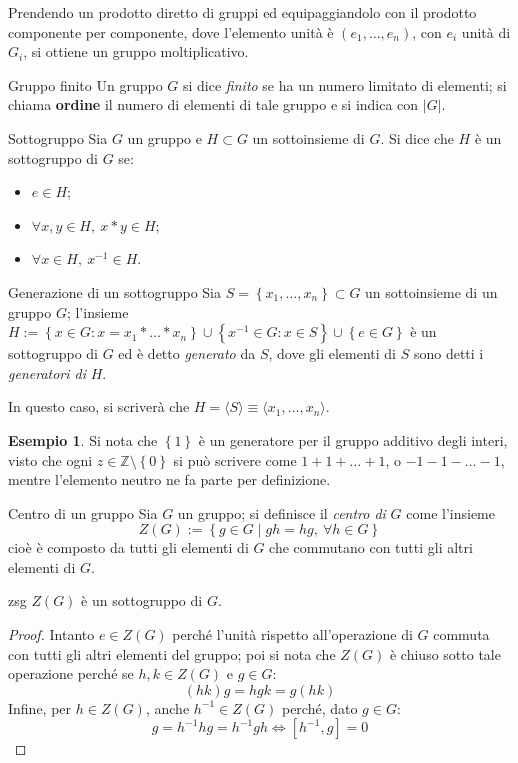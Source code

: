 \documentclass[11pt, a4paper]{scrartcl}
\theoremstyle{definition}
\newtheorem{esempio}{Esempio}
\numberwithin{esempio}{section}
\theoremstyle{definition}
\numberwithin{obs}{section}
\numberwithin{nota}{section}
\numberwithin{equation}{subsection}
\begin{document}
\noindent Prendendo un prodotto diretto di gruppi ed equipaggiandolo con il prodotto componente per componente, dove l'elemento unit\`a \`e $(e_1,\ldots,e_n)$, con $e_i$ unit\`a di $G_i$, si ottiene un gruppo moltiplicativo.
\begin{definizione}
	{Gruppo finito}{}
	Un gruppo $G$ si dice \textit{finito} se ha un numero limitato di elementi; si chiama \textbf{ordine} il numero di elementi di tale gruppo e si indica con $|G|$.
\end{definizione}
\begin{definizione}
	{Sottogruppo}{}
	Sia $G$ un gruppo e $H \subset G$ un sottoinsieme di $G$. Si dice che $H$ \`e un sottogruppo di $G$ se:
	\begin{itemize}
		\item  $e \in H$;
		\item $\forall x,y \in H, \ x*y \in H$;
		\item $\forall x \in H, \ x^{-1}  \in H$.
	\end{itemize}
\end{definizione}
\begin{definizione}
	{Generazione di un sottogruppo}{}
	Sia $S = \left\{ x_1,\ldots,x_n \right\} \subset  G$ un sottoinsieme di un gruppo $G$; l'insieme $H:= \left\{ x \in G : x = x_1 *\ldots*x_n  \right\}\cup \left\{ x^{-1} \in G : x \in S \right\} \cup \left\{ e \in G \right\}  $ \`e un sottogruppo di $G$ ed \`e detto \textit{generato} da $S$, dove gli elementi di $S$ sono detti i \textit{generatori di} $H$.

	In questo caso, si scriver\`a che $H = \langle S \rangle\equiv \langle x_1,\ldots,x_n \rangle$.
\end{definizione}
\begin{esempio}\label{1genz}
Si nota che $\left\{ 1 \right\} $ \`e un generatore per il gruppo additivo degli interi, visto che ogni $z \in \mathbb{Z} \setminus\left\{ 0 \right\} $ si pu\`o scrivere come $1 + 1+ \ldots +1$, o $-1 - 1-\ldots-1$, mentre l'elemento neutro ne fa parte per definizione.
\end{esempio}
\begin{definizione}
	{Centro di un gruppo}{}
	Sia $G$ un gruppo; si definisce il \textit{centro di} $G$ come l'insieme 
	\[
	Z(G) := \left\{ g \in G  \mid gh=hg, \ \forall h \in G \right\} 
	\] 
	cio\`e \`e composto da tutti gli elementi di $G$ che commutano con tutti gli altri elementi di $G$.
\end{definizione}
\begin{prop}
	{}{zsg}
	$Z(G)$ \`e un sottogruppo di $G$.
	\begin{proof}
		Intanto $e \in Z(G)$ perch\'e l'unit\`a rispetto all'operazione di $G$ commuta con tutti gli altri elementi del gruppo; poi si nota che $Z(G)$ \`e chiuso sotto tale operazione perch\'e se $h,k \in Z(G)$ e $g\in G$:
		\[
			(hk)g=hgk=g(hk)
		\] 
		Infine, per $h \in Z(G)$, anche $h^{-1}  \in Z(G)$ perch\'e, dato $g \in G$:
		\[
			g = h^{-1}h g  = h^{-1} g h \iff [h^{-1} , g] = 0
		\] 
		
	\end{proof}
\end{prop}
\end{document}

